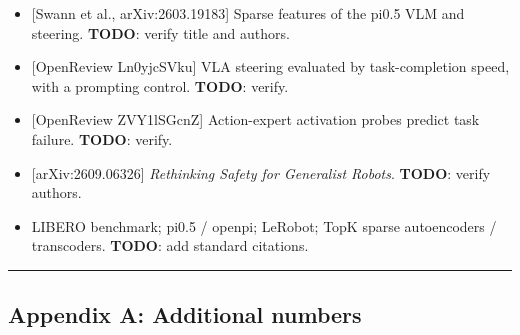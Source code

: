 \documentclass[
  10pt,
]{article}
\providecommand{\tightlist}{%
  \setlength{\itemsep}{0pt}\setlength{\parskip}{0pt}}
\begin{document}
\begin{itemize}
\tightlist
\item
  {[}Swann et al., arXiv:2603.19183{]} Sparse features of the pi0.5 VLM
  and steering. \textbf{TODO}: verify title and authors.
\item
  {[}OpenReview Ln0yjcSVku{]} VLA steering evaluated by task-completion
  speed, with a prompting control. \textbf{TODO}: verify.
\item
  {[}OpenReview ZVY1lSGcnZ{]} Action-expert activation probes predict
  task failure. \textbf{TODO}: verify.
\item
  {[}arXiv:2609.06326{]} \emph{Rethinking Safety for Generalist Robots}.
  \textbf{TODO}: verify authors.
\item
  LIBERO benchmark; pi0.5 / openpi; LeRobot; TopK sparse autoencoders /
  transcoders. \textbf{TODO}: add standard citations.
\end{itemize}

\begin{center}\rule{0.5\linewidth}{0.5pt}\end{center}

\hypertarget{appendix-a-additional-numbers}{%
\subsection{Appendix A: Additional
numbers}\label{appendix-a-additional-numbers}}
\end{document}
